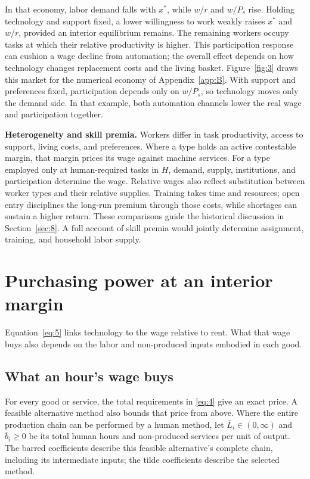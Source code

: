 \documentclass[12pt]{article}
\theoremstyle{plain}
\begin{document}
In that economy, labor demand falls with $x^*$, while $w/r$ and $w/P_s$ rise. Holding technology and support fixed, a lower willingness to work weakly raises $x^*$ and $w/r$, provided an interior equilibrium remains. The remaining workers occupy tasks at which their relative productivity is higher. This participation response can cushion a wage decline from automation; the overall effect depends on how technology changes replacement costs and the living basket. Figure~\ref{fig:3} draws this market for the numerical economy of Appendix~\ref{app:B}. With support and preferences fixed, participation depends only on $w/P_s$, so technology moves only the demand side. In that example, both automation channels lower the real wage and participation together.

\textbf{Heterogeneity and skill premia.} Workers differ in task productivity, access to support, living costs, and preferences. Where a type holds an active contestable margin, that margin prices its wage against machine services. For a type employed only at human-required tasks in $H$, demand, supply, institutions, and participation determine the wage. Relative wages also reflect substitution between worker types and their relative supplies. Training takes time and resources; open entry disciplines the long-run premium through those costs, while shortages can sustain a higher return. These comparisons guide the historical discussion in Section~\ref{sec:8}. A full account of skill premia would jointly determine assignment, training, and household labor supply.

\section{Purchasing power at an interior margin}\label{sec:6}

Equation~\eqref{eq:5} links technology to the wage relative to rent. What that wage buys also depends on the labor and non-produced inputs embodied in each good.

\subsection{What an hour's wage buys}\label{sec:6.1}

For every good or service, the total requirements in \eqref{eq:4} give an exact price. A feasible alternative method also bounds that price from above. Where the entire production chain can be performed by a human method, let $\bar L_i\in(0,\infty)$ and $\bar b_i\ge0$ be its total human hours and non-produced services per unit of output. The barred coefficients describe this feasible alternative's complete chain, including its intermediate inputs; the tilde coefficients describe the selected method.
\end{document}
